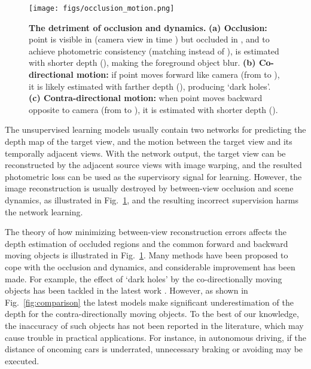\documentclass[letterpaper, 10 pt, conference]{ieeeconf}
\begin{document}
\begin{figure}[t]
\vspace{5pt}
\begin{center}
\texttt{[image: figs/occlusion\_motion.png]}
\end{center}
\vspace{-5pt}
\caption{\textbf{The detriment of occlusion and dynamics.} \textbf{(a) Occlusion:} point  is visible in  (camera view in time ) but occluded in , and to achieve photometric consistency (matching  instead of ),  is estimated with shorter depth (), making the foreground object blur. \textbf{(b) Co-directional motion:} if point  moves forward like camera  (from  to ), it is likely estimated with farther depth (), producing `dark holes'. \textbf{ (c) Contra-directional motion:} when point  moves backward opposite to camera  (from  to ), it is estimated with shorter depth ().}
\label{fig:om}
\vspace{-10pt}
\end{figure}



The unsupervised learning models usually contain two networks for predicting the depth map of the target view, and the motion between the target view and its temporally adjacent views. 
With the network output, the target view can be reconstructed by the adjacent source views with image warping, and the resulted photometric loss can be used as the supervisory signal for learning. 
However, the image reconstruction is usually destroyed by between-view occlusion and scene dynamics, as illustrated in Fig.~\ref{fig:om}, and the resulting incorrect supervision harms the network learning. 




The theory of how minimizing between-view reconstruction errors affects the depth estimation of occluded regions and the common forward and backward moving objects is illustrated in Fig.~\ref{fig:om}. 
Many methods have been proposed to cope with the occlusion and dynamics, and considerable improvement has been made. 
For example, the effect of `dark holes' by the co-directionally moving objects has been tackled in the latest work \cite{luo2019every, casser2019struct2depth, godard2019digging}. However, as shown in Fig.~\ref{fig:comparison} the latest models make significant underestimation of the depth for the contra-directionally moving objects. To the best of our knowledge, the inaccuracy of such objects has not been reported in the literature, which may cause trouble in practical applications. For instance, in autonomous driving, if the distance of oncoming cars is underrated, unnecessary braking or avoiding may be executed. 
\end{document}
